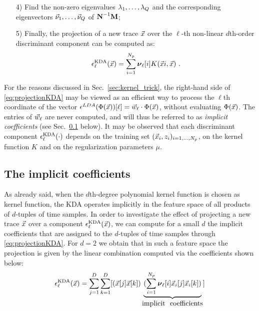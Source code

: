 \begin{itemize}
\item[4)]\label{point:eigs} Find the non-zero eigenvalues $\lambda_1, \dots, \lambda_Q$ and the corresponding eigenvectors $\vec{\nu}_1, \dots, \vec{\nu}_Q$ of $\textbf{N}^{-1}\textbf{M}$; 


\item[5)] Finally, the projection of a new trace $\vec{x}$ over the $\ell$-th non-linear $d$th-order discriminant component can be computed as:
\begin{equation}\label{eq:projectionKDA}
\epsilon^{\mathrm{KDA}}_{\ell}(\vec{x}) = \sum_{i=1}^{N_p}\boldsymbol{\nu}_\ell[i]K(\vec{x}{i}, \vec{x}) \mbox{ .}
\end{equation} 

\end{itemize}
For the reasons discussed in Sec.~\ref{sec:kernel_trick}, the right-hand side of \eqref{eq:projectionKDA} may be viewed as an efficient way to process the $\ell$th coordinate of the vector $\epsilon^{LDA}(\Phi(\vec{x}))[\ell] = \vec{w}_{\ell} \cdot \Phi(\vec{x})$,
without evaluating $\Phi(\vec{x})$. The entries of $\vec{w}_{\ell}$ are never computed, and will thus be referred to as \emph{implicit coefficients} (see Sec.~\ref{sec:implicit} below). It may be observed that each discriminant component $\epsilon^{\mathrm{KDA}}_{\ell}(\cdot)$ depends on the training set $(\vec{x}_i, z_i)_{i=1, \dots , N_p}$, on the kernel function $K$ and on the regularization parameters $\mu$.

\subsection{The implicit coefficients}\label{sec:implicit}
As already said, when the $d$th-degree  polynomial kernel function is chosen as kernel function, the KDA operates implicitly in the feature space of all products of $d$-tuples of time samples. In order to investigate the effect of projecting a new trace $\vec{x}$ over a component $\epsilon^{\mathrm{KDA}}_{\ell}(\vec{x})$, we can compute for a small $d$ the implicit coefficients that are assigned to the $d$-tuples of time samples through \eqref{eq:projectionKDA}. For $d=2$ we obtain that in such a feature space the projection is given by the linear combination computed via the coefficients shown below: 
\begin{equation}\label{eq:implicit}
\extract^{\mathrm{KDA}}_{\ell}(\vLeakVec) = \sum_{j=1}^\traceLength \sum_{k=1}^\traceLength[ (\vLeakVec[j]\vLeakVec[k])\underbrace{(\sum_{i=1}^{\nbProfilingTraces}\boldsymbol{\nu}_{\ell}[i] \vLeakVec_i[j]\vLeakVec_{i}[k])}_{\mbox{implicit \ coefficients}}]
\end{equation}





